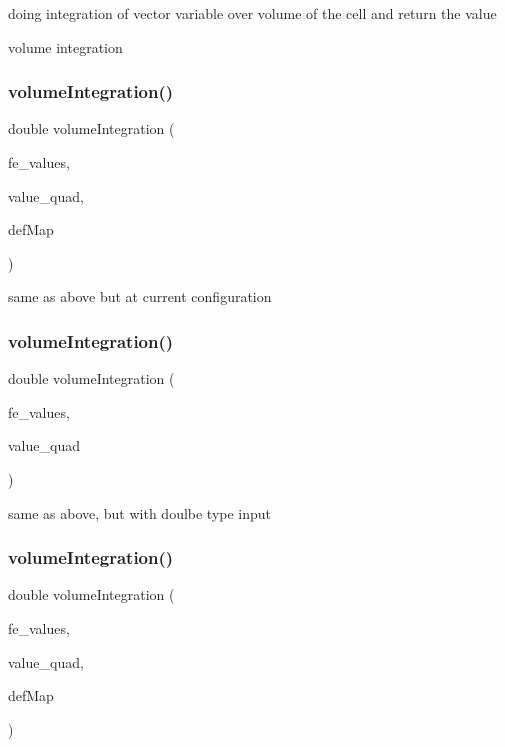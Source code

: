 doing integration of vector variable over volume of the cell and return the value

volume integration \mbox{\label{class_residual_a50acc2c1f154889f83606a2b2e2d555c}} 
\subsubsection{\texorpdfstring{volume\+Integration()}{volumeIntegration()}\hspace{0.1cm}{\footnotesize\ttfamily [4/6]}}
{\footnotesize\ttfamily double volume\+Integration (\begin{DoxyParamCaption}\item[{const F\+E\+Values$<$ dim $>$ \&}]{fe\+\_\+values,  }\item[{Table$<$ 1, Sacado\+::\+Fad\+::\+D\+Fad$<$ double $>$ $>$ \&}]{value\+\_\+quad,  }\item[{\mbox{\hyperlink{structdeformation_map}{deformation\+Map}}$<$ T, dim $>$ \&}]{def\+Map }\end{DoxyParamCaption})}

same as above but at current configuration \mbox{\label{class_residual_a734c1bb6a4a56aa1c774485441e47340}} 
\subsubsection{\texorpdfstring{volume\+Integration()}{volumeIntegration()}\hspace{0.1cm}{\footnotesize\ttfamily [5/6]}}
{\footnotesize\ttfamily double volume\+Integration (\begin{DoxyParamCaption}\item[{const F\+E\+Values$<$ dim $>$ \&}]{fe\+\_\+values,  }\item[{Table$<$ 1, double $>$ \&}]{value\+\_\+quad }\end{DoxyParamCaption})}

same as above, but with doulbe type input \mbox{\label{class_residual_ae097f5d9f2a92108cb0a1c7ecf4510c3}} 
\subsubsection{\texorpdfstring{volume\+Integration()}{volumeIntegration()}\hspace{0.1cm}{\footnotesize\ttfamily [6/6]}}
{\footnotesize\ttfamily double volume\+Integration (\begin{DoxyParamCaption}\item[{const F\+E\+Values$<$ dim $>$ \&}]{fe\+\_\+values,  }\item[{Table$<$ 1, double $>$ \&}]{value\+\_\+quad,  }\item[{\mbox{\hyperlink{structdeformation_map}{deformation\+Map}}$<$ T, dim $>$ \&}]{def\+Map }\end{DoxyParamCaption})}

